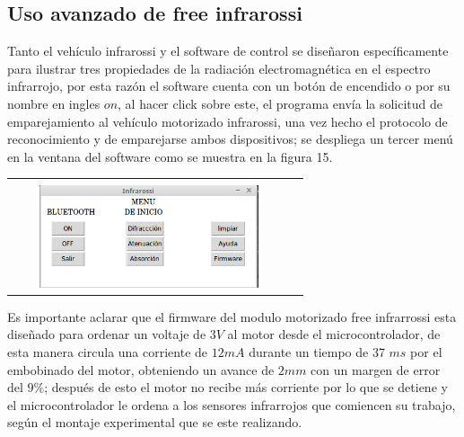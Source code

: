 \documentclass[12]{article}
\newenvironment{Figure}
{\par\medskip\noindent\minipage{\linewidth}}
{\endminipage\par\medskip}
\begin{document}
\begin{multicols}{2}
\subsection{Uso avanzado de free infrarossi}
Tanto el vehículo infrarossi y el software de control se diseñaron específicamente para ilustrar tres propiedades de la radiación electromagnética en el espectro infrarrojo, por esta razón el software cuenta con un botón de encendido o por su nombre en ingles $on$, al hacer click sobre este, el programa envía la solicitud de emparejamiento al vehículo motorizado infrarossi, una vez hecho el protocolo de reconocimiento y de emparejarse ambos dispositivos; se despliega un tercer menú en la ventana del software como se muestra en la figura 15.
\begin{Figure}	
\center
\begin{tabular}{|l|r|}
\hline\\
\includegraphics[width=8cm, height=3cm]{img/3menu.png} \\ \hline
\end{tabular}
\label{fig:g15}
\end{Figure}
Es importante aclarar que el firmware del modulo motorizado free infrarrossi esta diseñado para ordenar un voltaje de $3 V$ al motor desde el microcontrolador, de esta manera circula una corriente de $12 mA$ durante un tiempo de 37 $ms$ por el embobinado del motor, obteniendo un avance de  $2 mm$ con un margen de error del $9\%$; después de esto el motor no recibe más corriente por lo que se detiene y el microcontrolador le ordena a los sensores infrarrojos que  comiencen su trabajo, según el montaje experimental que se este realizando.

\end{multicols}
\end{document}
